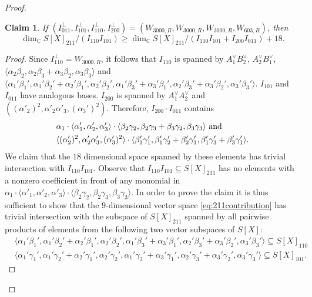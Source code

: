 \documentclass[12pt]{amsart}
\newtheorem{claim}{Claim}
\theoremstyle{definition}
\theoremstyle{remark}
\theoremstyle{definition}
\newcommand{\CC}{\mathbb{C}}
\begin{document}
\begin{proof}
\begin{claim}\label{cla:reducingST}
    If $(I_{011}^\perp, I_{101}^\perp, I_{110}^\perp, I_{200}^\perp) = (W_{3000,R}, W_{3000,R}, W_{3000,R}, W_{603,R})$, then 
    \[
    \dim_\CC S[X]_{211}/(I_{110}I_{101}) \ge \dim_\CC S[X]_{211}/(I_{110}I_{101}+ I_{200}I_{011}) + 18. 
    \]
\end{claim}
\begin{proof}
Since $I_{110}^\perp = W_{3000,R}$, it follows that $I_{110}$ is spanned by $A_1^\vee B_2^\vee$, $A_2^\vee B_1^\vee$,  $\langle \alpha_2\beta_2, \alpha_2\beta_3+\alpha_3\beta_2, \alpha_3\beta_3\rangle$ and $\langle \alpha_1'\beta_1', \alpha_1'\beta_2' + \alpha_2'\beta_1', \alpha_2'\beta_2', \alpha_1'\beta_3'+\alpha_3'\beta_1', \alpha_2'\beta_3'+\alpha_3'\beta_2', \alpha_3'\beta_3'\rangle$.
$I_{101}$ and $I_{011}$ have analogous bases. $I_{200}$ is spanned by $A_1^\vee A_2^\vee$ and $((\alpha'_2)^2, \alpha'_2\alpha'_3, (\alpha_3')^2)$. Therefore, $I_{200}\cdot I_{011}$ contains
\begin{align}
&\alpha_1\cdot \langle \alpha'_1, \alpha'_2, \alpha'_3\rangle \cdot \langle \beta_2\gamma_2, \beta_2\gamma_3+\beta_3\gamma_2, \beta_3\gamma_3\rangle \textrm{ and } \notag\\
&\langle (\alpha'_2)^2, \alpha'_2\alpha'_3, (\alpha'_3)^2\rangle \cdot \langle \beta_1'\gamma_1', \beta_1'\gamma_2'+\beta_2'\gamma'_1, \beta_1'\gamma_3'+\beta_3'\gamma_1'\rangle. \label{eq:211contribution}    
\end{align}
We claim that the $18$ dimensional space spanned by these elements has trivial intersection with $I_{110} I_{101}$.
Observe that $I_{110}I_{101}\subseteq S[X]_{211}$ has no elements with a nonzero coefficient in front of any monomial in $\alpha_1 \cdot \langle \alpha'_1, \alpha'_2,\alpha'_3\rangle \cdot \langle \beta_2\gamma_2, \beta_2\gamma_3, \beta_3\gamma_3\rangle$.
In order to prove the claim it is thus sufficient to show that the $9$-dimensional vector space \eqref{eq:211contribution} has trivial intersection with 
the subspace of $S[X]_{211}$ spanned by all pairwise products of elements from the following two vector subspaces of $S[X]$:
\begin{align*}
&\langle \alpha_1'\beta_1', \alpha_1'\beta_2' + \alpha_2'\beta_1', \alpha_2'\beta_2', \alpha_1'\beta_3'+\alpha_3'\beta_1', \alpha_2'\beta_3'+\alpha_3'\beta_2', \alpha_3'\beta_3' \rangle \subseteq S[X]_{110}   \\
&\langle \alpha_1'\gamma_1', \alpha_1'\gamma_2' + \alpha_2'\gamma_1', \alpha_2'\gamma_2', \alpha_1'\gamma_3'+\alpha_3'\gamma_1', \alpha_2'\gamma_3'+\alpha_3'\gamma_2', \alpha_3'\gamma_3'\rangle \subseteq S[X]_{101}.

\end{align*}
\end{proof}
\end{proof}
\end{document}
